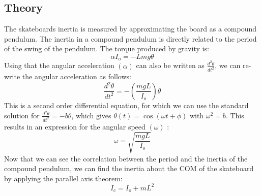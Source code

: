 \subsection*{Theory}
The skateboards inertia is measured by approximating the board as a compound pendulum. The inertia in a compound pendulum is directly related to the period of the swing of the pendulum. The torque produced by gravity is:
$$
\alpha I_o=-L m g \theta
$$
Using that the angular acceleration $(\alpha)$ can also be written as $\frac{d^2 \theta}{d t^2}$, we can re-write the angular acceleration as follows:
$$
\frac{d^2 \theta}{d t^2}=-\left(\frac{m g L}{I_o}\right) \theta
$$
This is a second order differential equation, for which we can use the standard solution for $\frac{d^2 \theta}{d t^2}=-b \theta$, which gives $\theta(t)=\cos (\omega t+\phi)$ with $\omega^2=b$. This results in an expression for the angular speed $(\omega)$ :
$$
\omega=\sqrt{\frac{m g L}{I_o}}
$$
Now that we can see the correlation between the period and the inertia of the compound pendulum, we can find the inertia about the COM of the skateboard by applying the parallel axis theorem:
\begin{equation}
    I_c = I_o + m L^2
\end{equation}
